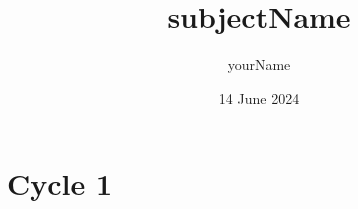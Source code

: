 \documentclass[a4paper,12pt,numbers=noenddot]{scrreprt} %
\title{subjectName}
\author{yourName}
\date{14 June 2024}
\begin{document}

\begin{titlepage}
\clearpage
\vspace*{\fill}
\begin{center}
\begin{minipage}{.6\textwidth}
\maketitle
\end{minipage}
\end{center}
\vfill %
\clearpage
\end{titlepage}




\setcounter{tocdepth}{1}
\tableofcontents

\part*{Cycle 1}
\end{document}
